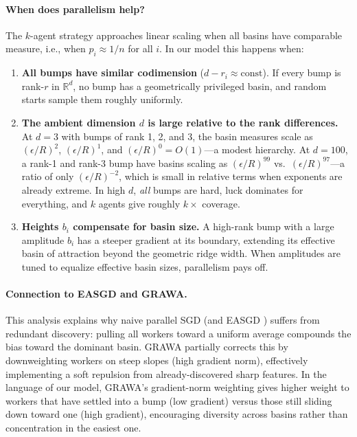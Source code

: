 \documentclass{article}
\begin{document}
\paragraph{When does parallelism help?}
The $k$-agent strategy approaches linear scaling when all basins have
comparable measure, i.e., when $p_i \approx 1/n$ for all $i$.  In our
model this happens when:
\begin{enumerate}
  \item \textbf{All bumps have similar codimension} ($d - r_i \approx
    \text{const}$).  If every bump is rank-$r$ in $\mathbb{R}^d$, no
    bump has a geometrically privileged basin, and random starts sample
    them roughly uniformly.
  \item \textbf{The ambient dimension $d$ is large relative to the rank
    differences.}  At $d = 3$ with bumps of rank 1, 2, and 3, the basin
    measures scale as $(\epsilon/R)^2$, $(\epsilon/R)^1$, and
    $(\epsilon/R)^0 = O(1)$---a modest hierarchy.  At $d = 100$, a
    rank-1 and rank-3 bump have basins scaling as $(\epsilon/R)^{99}$
    vs.\ $(\epsilon/R)^{97}$---a ratio of only $(\epsilon/R)^{-2}$,
    which is small in relative terms when exponents are already extreme.
    In high $d$, \emph{all} bumps are hard, luck dominates for
    everything, and $k$ agents give roughly $k\times$ coverage.
  \item \textbf{Heights $b_i$ compensate for basin size.}  A high-rank
    bump with a large amplitude $b_i$ has a steeper gradient at its
    boundary, extending its effective basin of attraction beyond the
    geometric ridge width.  When amplitudes are tuned to equalize
    effective basin sizes, parallelism pays off.
\end{enumerate}

\paragraph{Connection to EASGD and GRAWA.}
This analysis explains why naive parallel SGD (and EASGD
\cite{zhang2015easgd}) suffers from redundant discovery: pulling all
workers toward a uniform average compounds the bias toward the dominant
basin.  GRAWA \cite{dimlioglu2024grawa} partially corrects this by
downweighting workers on steep slopes (high gradient norm), effectively
implementing a soft repulsion from already-discovered sharp features.
In the language of our model, GRAWA's gradient-norm weighting gives
higher weight to workers that have settled into a bump (low gradient)
versus those still sliding down toward one (high gradient), encouraging
diversity across basins rather than concentration in the easiest one.
\end{document}
